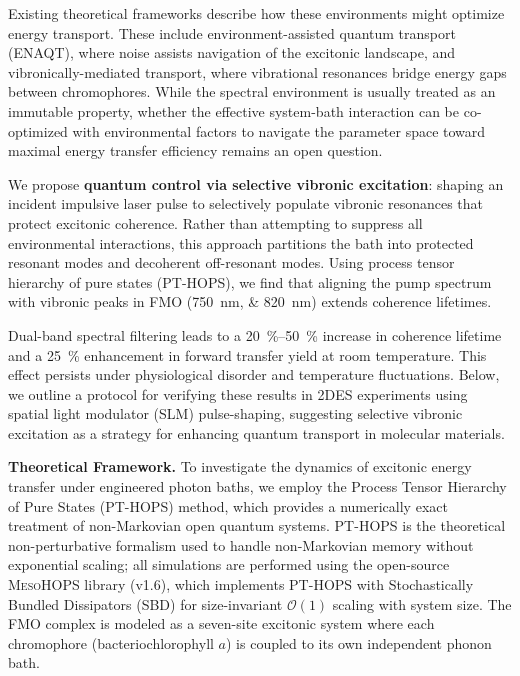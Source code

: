 \documentclass[journal=jpcl,manuscript=letter]{achemso}
\begin{document}
Existing theoretical frameworks describe how these environments might optimize energy transport. These include environment-assisted quantum transport (ENAQT), where noise assists navigation of the excitonic landscape,\cite{Mohseni2008,Rebentrost2009,Wu2010NewJPhys} and vibronically-mediated transport, where vibrational resonances bridge energy gaps between chromophores.\cite{Chin2013,Huelga2013} While the spectral environment is usually treated as an immutable property, whether the effective system-bath interaction can be co-optimized with environmental factors to navigate the parameter space toward maximal energy transfer efficiency remains an open question.

We propose \textbf{quantum control via selective vibronic excitation}: shaping an incident impulsive laser pulse to selectively populate vibronic resonances that protect excitonic coherence. Rather than attempting to suppress all environmental interactions, this approach partitions the bath into protected resonant modes and decoherent off-resonant modes. Using process tensor hierarchy of pure states (PT-HOPS),\cite{Citty2024a} we find that aligning the pump spectrum with vibronic peaks in FMO (\SIlist{750;820}{\nano\meter}) extends coherence lifetimes.

Dual-band spectral filtering leads to a \SIrange{20}{50}{\percent} increase in coherence lifetime and a \SI{25}{\percent} enhancement in forward transfer yield at room temperature. This effect persists under physiological disorder and temperature fluctuations. Below, we outline a protocol for verifying these results in 2DES experiments using spatial light modulator (SLM) pulse-shaping, suggesting selective vibronic excitation as a strategy for enhancing quantum transport in molecular materials.


\textbf{Theoretical Framework.}
To investigate the dynamics of excitonic energy transfer under engineered photon baths, we employ the Process Tensor Hierarchy of Pure States (PT-HOPS) method,\cite{Suess2014,Citty2024a} which provides a numerically exact treatment of non-Markovian open quantum systems. PT-HOPS is the theoretical non-perturbative formalism used to handle non-Markovian memory without exponential scaling; all simulations are performed using the open-source \textsc{MesoHOPS} library (v1.6),\cite{Varvelo2021a} which implements PT-HOPS with Stochastically Bundled Dissipators (SBD) for size-invariant $\mathcal{O}(1)$ scaling with system size. The FMO complex is modeled as a seven-site excitonic system where each chromophore (bacteriochlorophyll $a$) is coupled to its own independent phonon bath.
\end{document}
